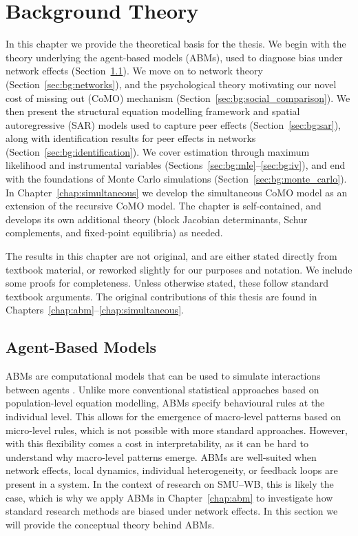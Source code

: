 
\chapter{Background Theory}
\label{chap:background}
In this chapter we provide the theoretical basis for the thesis. We begin with the theory underlying the agent-based models (ABMs), used to diagnose bias under network effects (Section~\ref{sec:bg:abm}). We move on to network theory (Section~\ref{sec:bg:networks}), and the psychological theory motivating our novel cost of missing out (CoMO) mechanism (Section~\ref{sec:bg:social_comparison}). We then present the structural equation modelling framework and spatial autoregressive (SAR) models used to capture peer effects (Section~\ref{sec:bg:sar}), along with identification results for peer effects in networks (Section~\ref{sec:bg:identification}). We cover estimation through maximum likelihood and instrumental variables (Sections~\ref{sec:bg:mle}--\ref{sec:bg:iv}), and end with the foundations of Monte Carlo simulations (Section~\ref{sec:bg:monte_carlo}). In Chapter~\ref{chap:simultaneous} we develop the simultaneous CoMO model as an extension of the recursive CoMO model. The chapter is self-contained, and develops its own additional theory (block Jacobian determinants, Schur complements, and fixed-point equilibria) as needed.

The results in this chapter are not original, and are either stated directly from textbook material, or reworked slightly for our purposes and notation. We include some proofs for completeness. Unless otherwise stated, these follow standard textbook arguments. The original contributions of this thesis are found in Chapters~\ref{chap:abm}--\ref{chap:simultaneous}.

\section{Agent-Based Models}
\label{sec:bg:abm}
ABMs are computational models that can be used to simulate interactions between agents \parencite{RailsbackGrimm2012}. Unlike more conventional statistical approaches based on population-level equation modelling, ABMs specify behavioural rules at the individual level. This allows for the emergence of macro-level patterns based on micro-level rules, which is not possible with more standard approaches. However, with this flexibility comes a cost in interpretability, as it can be hard to understand why macro-level patterns emerge. ABMs are well-suited when network effects, local dynamics, individual heterogeneity, or feedback loops are present in a system. In the context of research on SMU--WB, this is likely the case, which is why we apply ABMs in Chapter~\ref{chap:abm} to investigate how standard research methods are biased under network effects. In this section we will provide the conceptual theory behind ABMs.

